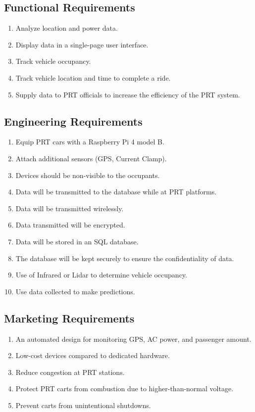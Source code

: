 \subsection{Functional Requirements}
\begin{enumerate}
    \item Analyze location and power data.
    \item Display data in a single-page user interface.
    \item Track vehicle occupancy.
    \item Track vehicle location and time to complete a ride.
    \item Supply data to PRT officials to increase the efficiency of the PRT system.
\end{enumerate}

\subsection{Engineering Requirements}
\begin{enumerate}
    \item Equip PRT cars with a Raspberry Pi 4 model B. 
    \item Attach additional sensors (GPS, Current Clamp).
    \item Devices should be non-visible to the occupants.
    \item Data will be transmitted to the database while at PRT platforms.
    \item Data will be transmitted wirelessly.
    \item Data transmitted will be encrypted. 
    \item Data will be stored in an SQL database.
    \item The database will be kept securely to ensure the confidentiality of data.
    \item Use of Infrared or Lidar to determine vehicle occupancy.
    \item Use data collected to make predictions.
\end{enumerate}

\subsection{Marketing Requirements}
\begin{enumerate}
    \item An automated design for monitoring GPS, AC power, and passenger amount.
    \item Low-cost devices compared to dedicated hardware.
    \item Reduce congestion at PRT stations.
    \item Protect PRT carts from combustion due to higher-than-normal voltage.
    \item Prevent carts from unintentional shutdowns.
\end{enumerate}

